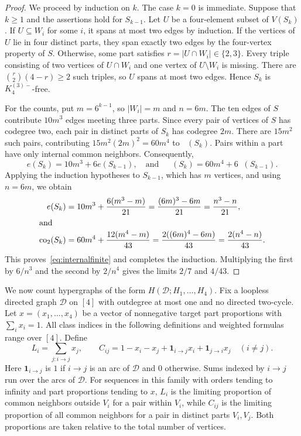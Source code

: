 \documentclass[11pt]{article}
\theoremstyle{remark}
\numberwithin{equation}{section}
\DeclareMathOperator{\co}{co_2}
\newcommand{\Km}{K_4^{(3)-}}
\begin{document}
\begin{proof}
We proceed by induction on $k$. The case $k=0$ is immediate. Suppose
that $k\ge1$ and the assertions hold for $S_{k-1}$.
Let $U$ be a four-element subset of $V(S_k)$. If $U\subseteq W_i$ for
some $i$, it spans at most two edges by induction. If the vertices of
$U$ lie in four distinct parts, they span exactly two edges by the
four-vertex property of $S$. Otherwise, some part satisfies
$r=|U\cap W_i|\in\{2,3\}$. Every triple consisting of two vertices
of $U\cap W_i$ and one vertex of $U\setminus W_i$ is missing. There
are $\binom r2(4-r)\ge2$ such triples, so $U$ spans at most two edges.
Hence $S_k$ is $\Km$-free.

For the counts, put $m=6^{k-1}$, so $|W_i|=m$ and $n=6m$.
The ten edges of $S$ contribute $10m^3$ edges meeting three parts.
Since every pair of vertices of $S$ has codegree two, each pair in
distinct parts of $S_k$ has codegree $2m$. There are $15m^2$ such
pairs, contributing $15m^2(2m)^2=60m^4$ to $\co(S_k)$.
Pairs within a part have only internal common neighbors. Consequently,
\[
 e(S_k)=10m^3+6e(S_{k-1}),\quad
 \text{and}
 \quad
 \co(S_k)=60m^4+6\co(S_{k-1}).
\]
Applying the induction hypotheses to $S_{k-1}$, which has $m$ vertices,
and using $n=6m$, we obtain
\begin{align*}
 e(S_k)&=10m^3+\frac{6(m^3-m)}{21}
        =\frac{(6m)^3-6m}{21}
        =\frac{n^3-n}{21},\\
 \intertext{and}
 \co(S_k)&=60m^4+\frac{12(m^4-m)}{43}
         =\frac{2((6m)^4-6m)}{43}
         =\frac{2(n^4-n)}{43}.
\end{align*}
This proves~\eqref{eq:internalfinite} and completes the induction.
Multiplying the first by $6/n^3$ and the second by $2/n^4$ gives
the limits $2/7$ and $4/43$.
\end{proof}

We now count hypergraphs of the form $H(\mathcal D;H_1,\ldots,H_4)$.
Fix a loopless directed graph $\mathcal D$ on $[4]$ with outdegree at
most one and no directed two-cycle. Let $x=(x_1,\ldots,x_4)$ be a vector
of nonnegative target part proportions with $\sum_i x_i=1$.
All class indices in the following definitions and weighted formulas
range over $[4]$. Define
\[
 L_i=\sum_{j:i\to j}x_j,\qquad
 C_{ij}=1-x_i-x_j+\mathbf1_{i\to j}x_i+\mathbf1_{j\to i}x_j
 \quad(i\ne j).
\]
Here $\mathbf1_{i\to j}$ is $1$ if $i\to j$ is an arc of $\mathcal D$
and $0$ otherwise. Sums indexed by $i\to j$ run over the arcs of
$\mathcal D$.
For sequences in this family with orders tending to infinity and
part proportions tending to $x$, $L_i$ is the limiting proportion of
common neighbors outside $V_i$ for a pair
within $V_i$, while $C_{ij}$ is the limiting proportion of all common
neighbors for a pair in distinct parts $V_i,V_j$. Both proportions are
taken relative to the total number of vertices.
\end{document}
